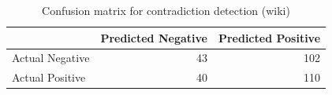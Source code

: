\begin{table}
\caption{Confusion matrix for contradiction detection (wiki)}
\label{tab:confusion_matrix}
\begin{tabular}{lrr}
\toprule
 & Predicted Negative & Predicted Positive \\
\midrule
Actual Negative & 43 & 102 \\
Actual Positive & 40 & 110 \\
\bottomrule
\end{tabular}
\end{table}
